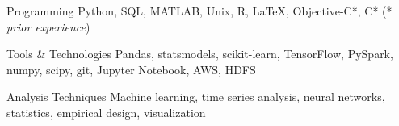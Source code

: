 

\begin{cvskills}

  \cvskill
    {Programming} %
    {Python, SQL, MATLAB, Unix, R, \LaTeX, Objective-C*, C* (* \textit{prior experience})} %

  \cvskill
    {Tools \& Technologies} %
    {Pandas, statsmodels, scikit-learn, TensorFlow, PySpark, numpy, scipy, git, Jupyter Notebook, AWS, HDFS} %

  \cvskill
    {Analysis Techniques} %
    {Machine learning, time series analysis, neural networks, statistics, empirical design, visualization} %

\end{cvskills}
